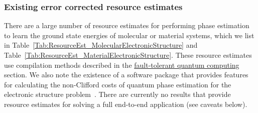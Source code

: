 \begin{refsection}
\subsubsection*{Existing error corrected resource estimates}
There are a large number of resource estimates for performing phase estimation to learn the ground state energies of molecular or material systems, which we list in Table~\ref{Tab:ResourceEst_MolecularElectronicStructure} and Table~\ref{Tab:ResourceEst_MaterialElectronicStructure}. These resource estimates use compilation methods described in the \hyperref[prim:FTQC]{fault-tolerant quantum computing} section. We also note the existence of a software package that provides features for calculating the non-Clifford costs of quantum phase estimation for the electronic structure problem~\cite{Casares2022TFermionSoftwarePackage}. There are currently no results that provide resource estimates for solving a full end-to-end application (see caveats below).



\end{refsection}
